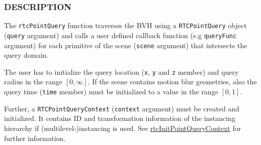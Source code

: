 \begin{Shaded}
\begin{Highlighting}[]

\OperatorTok{(}\OperatorTok{)}
\OperatorTok{\{}
  \OperatorTok{;}
  \OperatorTok{;}
  \OperatorTok{;}

  \OperatorTok{;}
  \OperatorTok{;}
\OperatorTok{\};}

\OperatorTok{(}
\OperatorTok{,}
  \OperatorTok{*}\OperatorTok{,}
  \OperatorTok{*}\OperatorTok{,}
  \OperatorTok{*}\OperatorTok{,}
  \OperatorTok{*}
\OperatorTok{);}
\end{Highlighting}
\end{Shaded}

\subsubsection{DESCRIPTION}\label{description}

The \texttt{rtcPointQuery} function traverses the BVH using a
\texttt{RTCPointQuery} object (\texttt{query} argument) and calls a user
defined callback function (e.g \texttt{queryFunc} argument) for each
primitive of the scene (\texttt{scene} argument) that intersects the
query domain.

The user has to initialize the query location (\texttt{x}, \texttt{y}
and \texttt{z} member) and query radius in the range \([0, \infty]\). If
the scene contains motion blur geometries, also the query time
(\texttt{time} member) must be initialized to a value in the range
\([0, 1]\).

Further, a \texttt{RTCPointQueryContext} (\texttt{context} argument)
must be created and initialized. It contains ID and transformation
information of the instancing hierarchy if (multilevel-)instancing is
used. See \hyperref[rtcinitpointquerycontext]{rtcInitPointQueryContext}
for further information.


